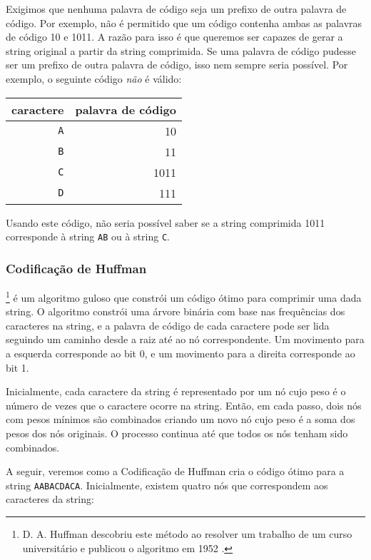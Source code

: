 Exigimos que nenhuma palavra de código
seja um prefixo de outra palavra de código.
Por exemplo, não é permitido que um código
contenha ambas as palavras de código 10
e 1011.
A razão para isso é que queremos
ser capazes de gerar a string original
a partir da string comprimida.
Se uma palavra de código pudesse ser um prefixo de outra palavra de código,
isso nem sempre seria possível.
Por exemplo, o seguinte código \emph{não} é válido:
\begin{center}
\begin{tabular}{rr}
caractere & palavra de código \\
\hline
\texttt{A} & 10 \\
\texttt{B} & 11 \\
\texttt{C} & 1011 \\
\texttt{D} & 111 \\
\end{tabular}
\end{center}
Usando este código, não seria possível saber
se a string comprimida 1011 corresponde à
string \texttt{AB} ou à string \texttt{C}.


\subsubsection{Codificação de Huffman}

\footnote{D. A. Huffman descobriu este método
ao resolver um trabalho de um curso universitário
e publicou o algoritmo em 1952 \cite{huf52}.} é um algoritmo guloso
que constrói um código ótimo para
comprimir uma dada string.
O algoritmo constrói uma árvore binária
com base nas frequências dos caracteres
na string,
e a palavra de código de cada caractere pode ser lida
seguindo um caminho desde a raiz até
ao nó correspondente.
Um movimento para a esquerda corresponde ao bit 0,
e um movimento para a direita corresponde ao bit 1.

Inicialmente, cada caractere da string é
representado por um nó cujo peso é o
número de vezes que o caractere ocorre na string.
Então, em cada passo, dois nós com pesos mínimos
são combinados criando
um novo nó cujo peso é a soma dos pesos
dos nós originais.
O processo continua até que todos os nós tenham sido combinados.

A seguir, veremos como a Codificação de Huffman cria
o código ótimo para a string
\texttt{AABACDACA}.
Inicialmente, existem quatro nós que correspondem
aos caracteres da string:

